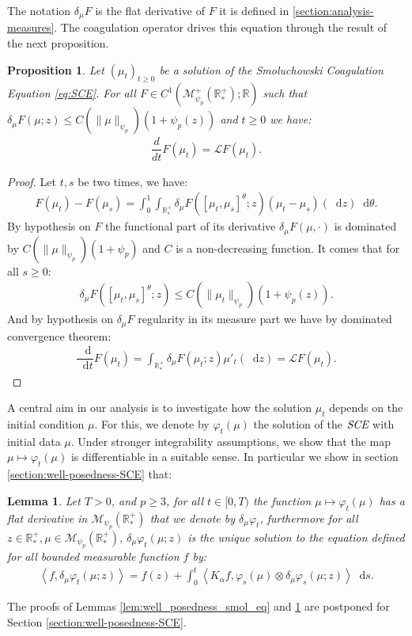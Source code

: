 \documentclass[11pt,a4paper]{article}
\newcommand{\RR}{\mathbb{R}}
\newcommand{\RRP}{\mathbb{R}^+_*}
\newcommand{\MC}{\mathcal{M}}
\newcommand{\LC}{\mathcal{L}}
\newcommand{\SCE}{\emph{SCE}}
\newcommand{\Proc}[1]{\left(#1\right)_{t\geq 0}}
\newcommand{\brac}[1]{\left\langle#1\right\rangle}
\newcommand{\dd}{\mathop{}\!\mathrm{d}}
\newtheorem{lemma}[theorem]{Lemma}
\newtheorem{proposition}[theorem]{Proposition}
\begin{document}
The notation $\delta_\mu F$ is the flat derivative of $F$ it is defined in \ref{section:analysis-measures}. The coagulation operator drives this equation through the result of the next proposition.
\begin{proposition}
    Let $\Proc{\mu_t}$ be a solution of the Smoluchowski Coagulation Equation \eqref{eq:SCE}. For all $F \in C^1(\MC_{\psi_p}^+\left(\RRP \right);\RR)$ such that $\delta_{\mu}F(\mu;z) \leq C(\|\mu\|_{\psi_p})(1 + \psi_p(z))$ and $t \geq 0$ we have:
    \begin{align*}
        \dfrac{d}{dt} F( \mu_t) = \LC F(\mu_t).
    \end{align*}
\end{proposition}
\begin{proof}
    Let $t,s$ be two times, we have:
    \begin{align*}
        F(\mu_t) - F(\mu_s) = \int_0^1 \int_{\RRP} \delta_\mu F(\left[\mu_t,\mu_s \right]^\theta;z) \left(\mu_t - \mu_s \right)(\dd z) \dd \theta.
    \end{align*}
    By hypothesis on $F$ the functional part of its derivative $\delta_\mu F(\mu,\cdot)$ is dominated by $C(\|\mu\|_{\psi_p})(1 + \psi_p)$ and $C$ is a non-decreasing function. It comes that for all $s \geq 0$:
    \begin{align*}
        \delta_\mu F(\left[\mu_t,\mu_s \right]^\theta;z) \leq C(\|\mu_t\|_{\psi_p}) (1 + \psi_p(z)). 
    \end{align*}
    And by hypothesis on $\delta_\mu F$ regularity in its measure part we have by dominated convergence theorem:
    \begin{align*}
        \dfrac{\dd}{\dd t} F(\mu_t) = \int_{\RRP} \delta_\mu F(\mu_t;z) \mu'_t(\dd z) = \LC F(\mu_t).
    \end{align*}
\end{proof}
    
    \medskip
    A central aim in our analysis is to investigate how the solution $\mu_t$ depends on the initial condition $\mu$. For this, we denote by $\varphi_t(\mu)$ the solution of the $\SCE$ with initial data $\mu$. Under stronger integrability assumptions, we show that the map $\mu \mapsto \varphi_t(\mu)$ is differentiable in a suitable sense. In particular we show in section \ref{section:well-posedness-SCE} that:
\begin{lemma}\label{lem:derivative-existence-and-eq}
    Let $T > 0$, and $p \geq 3$, for all $t \in [0,T)$ the function $ \mu \mapsto \varphi_t(\mu)$ has a flat derivative in $\MC_{\psi_p}(\RRP)$ that we denote by $\delta_\mu\varphi_t$, furthermore for all $z \in \RRP, \mu \in \MC_{\psi_p}(\RRP)$, $\delta_\mu\varphi_t(\mu;z)$ is the unique solution to the equation defined for all bounded measurable function $f$ by:
    \begin{align*}
        \brac{f,\delta_\mu\varphi_t(\mu;z)} = f(z) + \int_0^t \brac{K_{\alpha} f,\varphi_s(\mu)\otimes \delta_\mu\varphi_s(\mu;z)} \dd s.
    \end{align*}
\end{lemma}
The proofs of Lemmas \ref{lem:well_posedness_smol_eq} and \ref{lem:derivative-existence-and-eq} are postponed for Section \ref{section:well-posedness-SCE}. 
\end{document}
